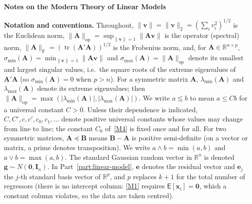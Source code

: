 \documentclass[12pt,a4paper]{article}
\theoremstyle{definition}
\newcommand\expc{\mathsf{E}}
\DeclareMathOperator\tr{tr}
\newcommand{\bx}{\mathbf{x}}
\newcommand{\bI}{\mathbf{I}}
\newcommand{\bzero}{\mathbf{0}}
\newcommand{\bA}{\mathbf{A}}
\newcommand{\bv}{\mathbf{v}}
\newcommand{\Real}{\mathbb{R}}
\newcommand{\opnorm}[1]{\|#1\|_{\mathrm{op}}}
\newcommand{\fnorm}[1]{\|#1\|_{\mathrm{F}}}
\begin{document}
\begingroup
\centering
{\LARGE\bfseries Notes on the Modern Theory of Linear Models\par}
\vspace{4pt}
\endgroup


\noindent\textbf{Notation and conventions.}\; Throughout, $\|\bv\| = \|\bv\|_2 = (\sum_i v_i^2)^{1/2}$ is the Euclidean norm, $\opnorm{\bA} = \sup_{\|\bv\|=1}\|\bA\bv\|$ is the operator (spectral) norm, $\fnorm{\bA} = (\tr(\bA'\bA))^{1/2}$ is the Frobenius norm, and, for $\bA \in \Real^{n \times p}$, $\sigma_{\min}(\bA) = \min_{\|\bv\|=1}\|\bA\bv\|$ and $\sigma_{\max}(\bA) = \opnorm{\bA}$ denote its smallest and largest singular values, i.e.\ the square roots of the extreme eigenvalues of $\bA'\bA$ (so $\sigma_{\min}(\bA) = 0$ when $p > n$). For a symmetric matrix $\bA$, $\lambda_{\min}(\bA)$ and $\lambda_{\max}(\bA)$ denote its extreme eigenvalues; then $\opnorm{\bA} = \max(|\lambda_{\min}(\bA)|, |\lambda_{\max}(\bA)|)$. We write $a \lesssim b$ to mean $a \leqslant Cb$ for a universal constant $C > 0$. Unless their dependence is indicated, $C, C', c, c', c_0, c_1, \ldots$ denote positive universal constants whose values may change from line to line; the constant $C_0$ of~\ref{M4} is fixed once and for all. For two symmetric matrices, $\bA \preceq \mathbf{B}$ means $\mathbf{B} - \bA$ is positive semi-definite (on a vector or matrix, a prime denotes transposition). We write $a \wedge b = \min(a,b)$ and $a \vee b = \max(a,b)$. The standard Gaussian random vector in $\Real^n$ is denoted $\mathbf{g} \sim N(\bzero, \bI_n)$. In Part~\ref{part:linear-model}, $\mathbf{e}$ denotes the residual vector and $\mathbf{e}_j$ the $j$-th standard basis vector of $\Real^p$, and $p$ replaces $k+1$ for the total number of regressors (there is no intercept column: \ref{M1} requires $\expc[\bx_i] = \bzero$, which a constant column violates, so the data are taken centred).
\end{document}
